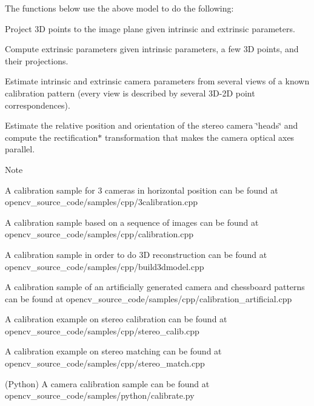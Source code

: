 The functions below use the above model to do the following\+: 


\begin{DoxyItemize}
\item Project 3D points to the image plane given intrinsic and extrinsic parameters.
\item Compute extrinsic parameters given intrinsic parameters, a few 3D points, and their projections.
\item Estimate intrinsic and extrinsic camera parameters from several views of a known calibration pattern (every view is described by several 3\+D-\/2D point correspondences).
\item Estimate the relative position and orientation of the stereo camera \char`\"{}heads\char`\"{} and compute the rectification$\ast$ transformation that makes the camera optical axes parallel. 
\end{DoxyItemize}

\begin{DoxyNote}{Note}

\begin{DoxyItemize}
\item A calibration sample for 3 cameras in horizontal position can be found at opencv\+\_\+source\+\_\+code/samples/cpp/3calibration.\+cpp
\begin{DoxyItemize}
\item A calibration sample based on a sequence of images can be found at opencv\+\_\+source\+\_\+code/samples/cpp/calibration.\+cpp
\item A calibration sample in order to do 3D reconstruction can be found at opencv\+\_\+source\+\_\+code/samples/cpp/build3dmodel.\+cpp
\item A calibration sample of an artificially generated camera and chessboard patterns can be found at opencv\+\_\+source\+\_\+code/samples/cpp/calibration\+\_\+artificial.\+cpp
\item A calibration example on stereo calibration can be found at opencv\+\_\+source\+\_\+code/samples/cpp/stereo\+\_\+calib.\+cpp
\item A calibration example on stereo matching can be found at opencv\+\_\+source\+\_\+code/samples/cpp/stereo\+\_\+match.\+cpp
\item (Python) A camera calibration sample can be found at opencv\+\_\+source\+\_\+code/samples/python/calibrate.\+py 
\end{DoxyItemize}
\end{DoxyItemize}
\end{DoxyNote}


